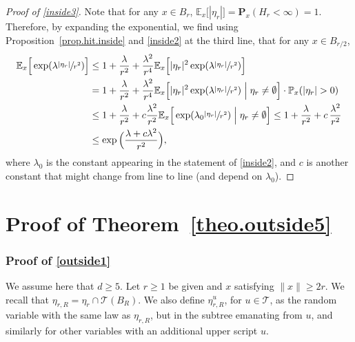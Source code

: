\begin{proof}[Proof of \eqref{inside3}]
Note that for any $x\in B_r$, $\mathbb E_x\big[|\eta_r|\big] =
\mathbf P_x(H_r<\infty) = 1$.
Therefore, by expanding the exponential,
we find using Proposition~\ref{prop.hit.inside} and \eqref{inside2} at the third line, that for any $x\in B_{r/2}$,
\begin{align*}
\mathbb E_x\Big[\exp(\lambda
\sfrac{|\eta_r|}{r^2})\Big] & \le 1 + \frac{\lambda}{r^2} + \frac{\lambda^2}{r^4} \mathbb E_x\Big[|\eta_r|^2\exp(\lambda \sfrac{|\eta_r|}{r^2})\Big]\\
& = 1 + \frac{\lambda}{r^2} + \frac{\lambda^2}{r^4} \mathbb E_x\Big[|\eta_r|^2 \exp(\lambda \sfrac{|\eta_r|}{r^2})\Bigm|\eta_r \neq \emptyset \Big]\cdot \mathbb P_x(|\eta_r|>0) \\
&\le 1+ \frac{\lambda}{r^2} + c\frac{\lambda^2}{r^2} \mathbb E_x\Big[ \exp(\lambda_0 \sfrac{|\eta_r|}{r^2})\Bigm|\eta_r\neq \emptyset \Big] \le 1+ \frac{\lambda}{r^2} + c\,\frac{\lambda^2}{r^2}\\
& \le \exp\Big(\frac{\lambda + c\lambda^2}{r^2}\Big),
\end{align*}
where $\lambda_0$ is the constant appearing in the statement of \eqref{inside2}, and $c$ is another constant that might change from line to line (and depend on $\lambda_0$).
\end{proof}

\section{Proof of Theorem~\ref{theo.outside5}}\label{sec-outside5}
\subsubsection*{Proof of \eqref{outside1}}
We assume here that $d\ge 5$. Let $r\ge 1$ be given and $x$ satisfying $\|x\|\ge 2r$.
We recall that $\eta_{r,R}=\eta_r\cap \mathcal T(B_R)$. We also define $\eta_{r,R}^u$, for $u\in \mathcal T$, as the random variable with the
same law as $\eta_{r,R}$, but in the subtree emanating from $u$, and similarly for other variables with an additional upper script $u$.

